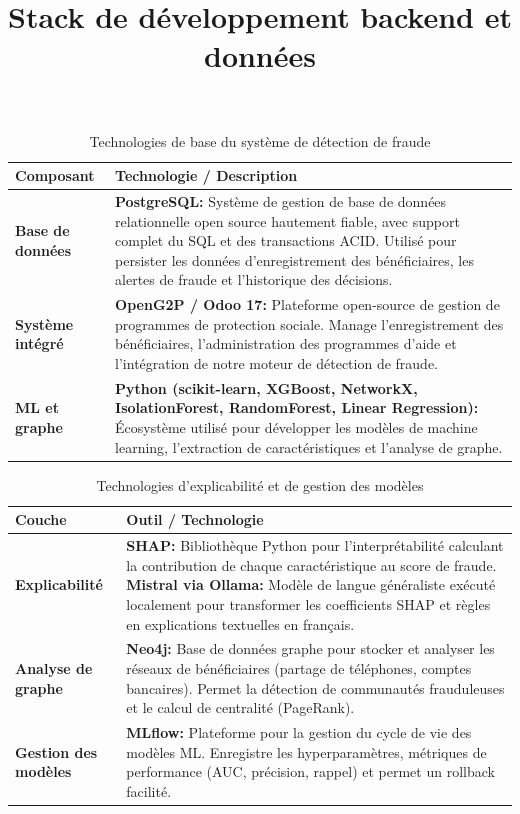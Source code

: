 \documentclass[a4paper, oneside, 12pt]{book}
\newcommand{\thead}[1]{\cellcolor{EYdark}\textcolor{white}{\textbf{#1}}}
\renewcommand{\thead}[1]{\cellcolor{EYyellow}\textcolor{EYdark}{\textbf{#1}}}
\begin{document}
\title{Stack de développement backend et données}
\begin{table}[H]
\centering
\renewcommand{\arraystretch}{1.5}
\begin{tabular}{|p{3.5cm}|p{11.8cm}|}
\hline
\thead{Composant} & \thead{Technologie / Description} \\
\hline
\textbf{Base de données} & \textbf{PostgreSQL:} Système de gestion de base de données relationnelle open source hautement fiable, avec support complet du SQL et des transactions ACID. Utilisé pour persister les données d'enregistrement des bénéficiaires, les alertes de fraude et l'historique des décisions. \\
\hline
\textbf{Système intégré} & \textbf{OpenG2P / Odoo 17:} Plateforme open-source de gestion de programmes de protection sociale. Manage l'enregistrement des bénéficiaires, l'administration des programmes d'aide et l'intégration de notre moteur de détection de fraude. \\
\hline
\textbf{ML et graphe} & \textbf{Python (scikit-learn, XGBoost, NetworkX, IsolationForest, RandomForest, Linear Regression):} Écosystème utilisé pour développer les modèles de machine learning, l'extraction de caractéristiques et l'analyse de graphe. \\
\hline
\end{tabular} 
 
\caption{Technologies de base du système de détection de fraude}
\end{table}
\begin{table}[H]
\centering
\renewcommand{\arraystretch}{1.5}
\begin{tabular}{|p{3.5cm}|p{11.8cm}|}
\hline
\thead{Couche} & \thead{Outil / Technologie} \\
\hline
\textbf{Explicabilité} & \textbf{SHAP:} Bibliothèque Python pour l'interprétabilité calculant la contribution de chaque caractéristique au score de fraude. \textbf{Mistral via Ollama:} Modèle de langue généraliste exécuté localement pour transformer les coefficients SHAP et règles en explications textuelles en français. \\
\hline
\textbf{Analyse de graphe} & \textbf{Neo4j:} Base de données graphe pour stocker et analyser les réseaux de bénéficiaires (partage de téléphones, comptes bancaires). Permet la détection de communautés frauduleuses et le calcul de centralité (PageRank). \\
\hline
\textbf{Gestion des modèles} & \textbf{MLflow:} Plateforme pour la gestion du cycle de vie des modèles ML. Enregistre les hyperparamètres, métriques de performance (AUC, précision, rappel) et permet un rollback facilité. \\
\hline
\end{tabular}
\caption{Technologies d'explicabilité et de gestion des modèles}
\end{table}
\end{document}
